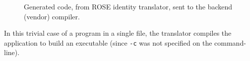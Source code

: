 \begin{figure}[!h]
{\indent
{\mySmallFontSize


\begin{latexonly}
   
\end{latexonly}

\begin{htmlonly}
   
\end{htmlonly}

}
}
\caption{Generated code, from ROSE identity translator, sent to the backend (vendor) compiler.}
\label{Tutorial:exampleOutputFromTranslator}
\end{figure}

  In this trivial case of a program in a single file, the translator
compiles the application to build an executable (since {\tt -c}
was not specified on the command-line).




